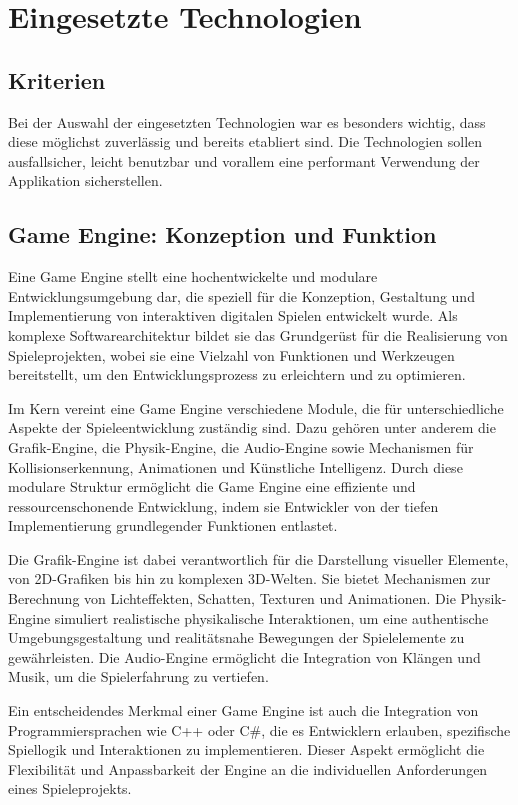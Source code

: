\section{Eingesetzte Technologien}

\subsection{Kriterien}
Bei der Auswahl der eingesetzten Technologien war es besonders wichtig, dass diese möglichst
zuverlässig und bereits etabliert sind. Die Technologien sollen ausfallsicher, leicht benutzbar
und vorallem eine performant Verwendung der Applikation sicherstellen.

\subsection{Game Engine: Konzeption und Funktion}
Eine Game Engine stellt eine hochentwickelte und modulare Entwicklungsumgebung dar, die speziell für die Konzeption,
Gestaltung und Implementierung von interaktiven digitalen Spielen entwickelt wurde. Als komplexe Softwarearchitektur
bildet sie das Grundgerüst für die Realisierung von Spieleprojekten, wobei sie eine Vielzahl von Funktionen und
Werkzeugen bereitstellt, um den Entwicklungsprozess zu erleichtern und zu optimieren.

Im Kern vereint eine Game Engine verschiedene Module, die für unterschiedliche Aspekte der Spieleentwicklung zuständig
sind. Dazu gehören unter anderem die Grafik-Engine, die Physik-Engine, die Audio-Engine sowie Mechanismen für
Kollisionserkennung, Animationen und Künstliche Intelligenz. Durch diese modulare Struktur ermöglicht die Game Engine
eine effiziente und ressourcenschonende Entwicklung, indem sie Entwickler von der tiefen Implementierung grundlegender
Funktionen entlastet.

Die Grafik-Engine ist dabei verantwortlich für die Darstellung visueller Elemente, von 2D-Grafiken bis hin zu
komplexen 3D-Welten. Sie bietet Mechanismen zur Berechnung von Lichteffekten, Schatten, Texturen und Animationen.
Die Physik-Engine simuliert realistische physikalische Interaktionen, um eine authentische Umgebungsgestaltung und
realitätsnahe Bewegungen der Spielelemente zu gewährleisten. Die Audio-Engine ermöglicht die Integration von Klängen
und Musik, um die Spielerfahrung zu vertiefen.

Ein entscheidendes Merkmal einer Game Engine ist auch die Integration von Programmiersprachen wie C++ oder C#, die es
Entwicklern erlauben, spezifische Spiellogik und Interaktionen zu implementieren. Dieser Aspekt ermöglicht die
Flexibilität und Anpassbarkeit der Engine an die individuellen Anforderungen eines Spieleprojekts.

